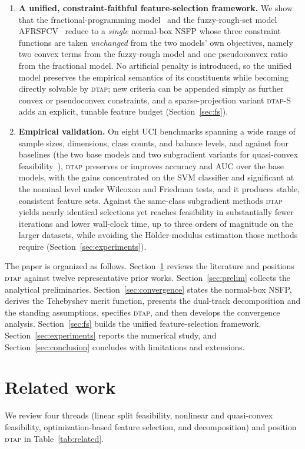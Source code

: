 \documentclass[]{interact}
\theoremstyle{plain}
\theoremstyle{definition}
\theoremstyle{remark}
\newcommand{\dtap}{\textsc{dtap}}
\begin{document}
\begin{enumerate}[label=\textbf{C\arabic*.},leftmargin=2.4em,itemsep=4pt]
\item \textbf{A unified, constraint-faithful feature-selection framework.} We show that the fractional-programming model~\citep{wang2021fractional} and the fuzzy-rough-set model AFRSFCV~\citep{wang2026afrsfcv} reduce to a \emph{single} normal-box NSFP whose three constraint functions are taken \emph{unchanged} from the two models' own objectives, namely two convex terms from the fuzzy-rough model and one pseudoconvex ratio from the fractional model. No artificial penalty is introduced, so the unified model preserves the empirical semantics of its constituents while becoming directly solvable by \dtap; new criteria can be appended simply as further convex or pseudoconvex constraints, and a sparse-projection variant \dtap-S adds an explicit, tunable feature budget (Section~\ref{sec:fs}).
\item \textbf{Empirical validation.} On eight UCI benchmarks spanning a wide range of sample sizes, dimensions, class counts, and balance levels, and against four baselines (the two base models and two subgradient variants for quasi-convex feasibility~\citep{hu2022quasi}), \dtap{} preserves or improves accuracy and AUC over the base models, with the gains concentrated on the SVM classifier and significant at the nominal level under Wilcoxon and Friedman tests, and it produces stable, consistent feature sets. Against the same-class subgradient methods \dtap{} yields nearly identical selections yet reaches feasibility in substantially fewer iterations and lower wall-clock time, up to three orders of magnitude on the larger datasets, while avoiding the H\"older-modulus estimation those methods require (Section~\ref{sec:experiments}).
\end{enumerate}

The paper is organized as follows. Section~\ref{sec:related} reviews the literature and positions \dtap{} against twelve representative prior works. Section~\ref{sec:prelim} collects the analytical preliminaries. Section~\ref{sec:convergence} states the normal-box NSFP, derives the Tchebyshev merit function, presents the dual-track decomposition and the standing assumptions, specifies \dtap, and then develops the convergence analysis. Section~\ref{sec:fs} builds the unified feature-selection framework. Section~\ref{sec:experiments} reports the numerical study, and Section~\ref{sec:conclusion} concludes with limitations and extensions.

\section{Related work}\label{sec:related}
We review four threads (linear split feasibility, nonlinear and quasi-convex feasibility,
optimization-based feature selection, and decomposition) and position \dtap{} in
Table~\ref{tab:related}.
\end{document}
